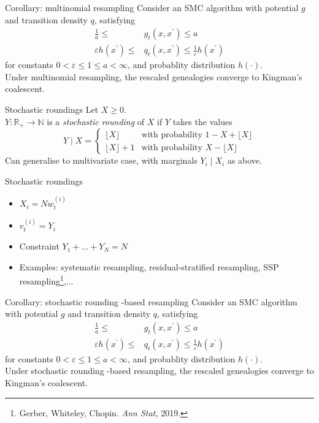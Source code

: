 \documentclass[aspectratio=169]{beamer}
\theoremstyle{definition}
\newcommand{\vt}[2][t]{v_{#1}^{(#2)}}
\newcommand{\wt}[2][t]{w_{#1}^{(#2)}}
\begin{document}
\begin{frame}{Corollary: multinomial resampling}
Consider an SMC algorithm with potential $g$ and transition density $q$, satisfying
\begin{align*}
\frac{1}{a} \leq &g_t(x, x^\prime) \leq a \\
\varepsilon h(x^\prime) \leq &q_t(x, x^\prime) \leq \frac{1}{\varepsilon} h(x^\prime) 
\end{align*}
for constants $0<\varepsilon\leq 1\leq a<\infty$, and probablity distribution $h(\cdot)$.\\[10pt]

Under multinomial resampling, the rescaled genealogies converge to Kingman's coalescent.
\end{frame}

\begin{frame}{Stochastic roundings}
\pause
Let $X\geq 0$.\\
$Y: \mathbb{R}_+ \to \mathbb{N}$ is a \emph{stochastic rounding} of $X$ if $Y$ takes the values
\begin{equation*}
Y \mid X =
\begin{cases}
 \lfloor X \rfloor & \text{with probability } 1- X+ \lfloor X \rfloor \\
  \lfloor X \rfloor +1 & \text{with probability } X- \lfloor X \rfloor 
\end{cases}
\end{equation*}
\pause
Can generalise to multivariate case, with marginals $Y_i \mid X_i$ as above.
\end{frame}

\begin{frame}{Stochastic roundings} %
\begin{itemize}
\item $X_i = N\wt{i}$
\item $\vt{i} = Y_i$
\item Constraint $Y_1+\dots +Y_N = N$
\pause
\item Examples: systematic resampling, residual-stratified resampling, SSP resampling\footnote{Gerber, Whiteley, Chopin. \textit{Ann Stat,} 2019.},...
\end{itemize}
\end{frame}

\begin{frame}{Corollary: stochastic rounding -based resampling}
Consider an SMC algorithm with potential $g$ and transition density $q$, satisfying
\begin{align*}
\frac{1}{a} \leq &g_t(x, x^\prime) \leq a \\
\varepsilon h(x^\prime) \leq &q_t(x, x^\prime) \leq \frac{1}{\varepsilon} h(x^\prime) 
\end{align*}
for constants $0<\varepsilon\leq 1\leq a<\infty$, and probablity distribution $h(\cdot)$.\\[10pt]

Under stochastic rounding -based resampling, the rescaled genealogies converge to Kingman's coalescent.
\end{frame}
\end{document}
